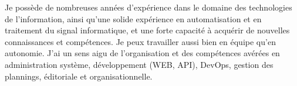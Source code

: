 
Je possède de nombreuses années d'expérience dans le domaine des technologies de 
l'information, ainsi qu'une solide expérience en automatisation et en traitement 
du signal informatique, et une forte capacité à acquérir de nouvelles connaissances 
et compétences. 
\newline
Je peux travailler aussi bien en équipe qu'en autonomie. J'ai un sens aigu de 
l'organisation et des compétences avérées en administration système, développement 
(WEB, API), DevOps, gestion des plannings, éditoriale et organisationnelle.

